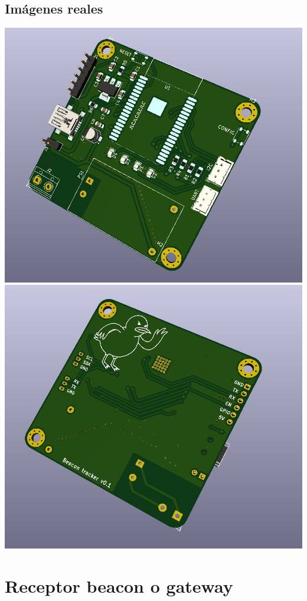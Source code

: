 \documentclass[a4paper ,12pt, onecolumn]{article}
\begin{document}
    \subsection{Imágenes reales}
        \includegraphics[scale=0.4]{../receiver_1.PNG}
        \includegraphics[scale=0.4]{../receiver_2.PNG}

\section{Receptor beacon o gateway}
\end{document}
